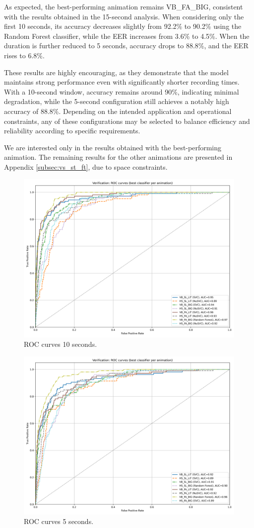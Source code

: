 \documentclass[12pt]{report}
\begin{document}
As expected, the best-performing animation remains VB\_FA\_BIG, consistent with the results obtained in the 15-second analysis.
When considering only the first 10 seconds, its accuracy decreases slightly from 92.2\% to 90.2\% using the Random Forest classifier, while the EER increases from 3.6\% to 4.5\%.
When the duration is further reduced to 5 seconds, accuracy drops to 88.8\%, and the EER rises to 6.8\%.

These results are highly encouraging, as they demonstrate that the model maintains strong performance even with significantly shorter recording times.
With a 10-second window, accuracy remains around 90\%, indicating minimal degradation, while the 5-second configuration still achieves a notably high accuracy of 88.8\%.
Depending on the intended application and operational constraints, any of these configurations may be selected to balance efficiency and reliability according to specific requirements.

We are interested only in the results obtained with the best-performing animation.
The remaining results for the other animations are presented in Appendix \ref{subsec:vs_st_ft}, due to space constraints.

\begin{figure}[ht]
    \centering
    \includegraphics[width = 0.6
    \textwidth]{Images/Results/Verification_single_five_ten/st/ten/best_animation_roc_curves_ten_st.png}
    \caption{ROC curves 10 seconds.}
    \label{fig:roc_t}
\end{figure}

\begin{figure}[ht]
    \centering
    \includegraphics[width = 0.6
    \textwidth]{Images/Results/Verification_single_five_ten/st/five/best_animation_roc_curves_five_st.png}
    \caption{ROC curves 5 seconds.}
    \label{fig:roc_f}
\end{figure}
\end{document}
